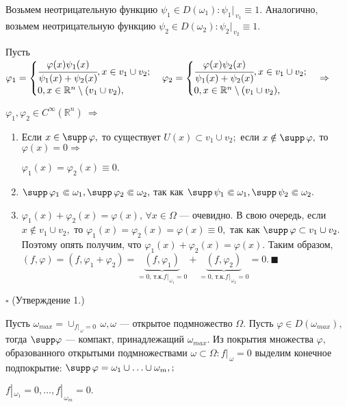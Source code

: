 \documentclass[12pt,a4paper,draft]{article}
\DeclareRobustCommand*{\т}{~--- }
\DeclareRobustCommand*{\ч}{~-- }
\begin{document}
Возьмем неотрицательную функцию $\psi_1\in D(\omega_1)\colon
\psi_1|_{\,v_1}\equiv1.$ Аналогично, возьмем неотрицательную
функцию $\psi_2\in D(\omega_2)\colon \psi_2|_{\,v_2}\equiv1.$

Пусть $\varphi_1=\begin{cases} \cfrac{\varphi(x)\psi_1(x)}{\psi_1(x)+\psi_2(x)}, x\in v_1\cup v_2;\\
0, x\in \mathbb R^n\setminus(v_1\cup v_2),\end{cases} \varphi_2=\begin{cases} \cfrac{\varphi(x)\psi_2(x)}{\psi_1(x)+\psi_2(x)}, x\in v_1\cup v_2;\\
0, x\in \mathbb R^n\setminus(v_1\cup v_2),\end{cases} \Rightarrow$

$\varphi_1, \varphi_2 \in C^{\infty}(\mathbb R^n)\ \Rightarrow$
\begin{enumerate}
\item Если $x\in \supp \,\varphi,$ то существует $U(x)\subset v_1\cup
v_2;$ если $x\notin \supp \,\varphi,$ то $\varphi(x)=0
\Rightarrow$

$\varphi_1(x)=\varphi_2(x)\equiv0.$
\item $\supp \,\varphi_1\Subset \omega_1, \supp \,\varphi_2\Subset
\omega_2,$ так как $\supp \,\psi_1\Subset \omega_1, \supp
\,\psi_2\Subset \omega_2.$
\item $\varphi_1(x)+\varphi_2(x)=\varphi(x),\,\forall x\in \Omega$
--- очевидно.
В свою очередь, если $x\notin v_1\cup v_2,$ то
$\varphi_1(x)=\varphi_2(x)=\varphi(x)\equiv0,$ так как $\supp
\,\varphi \subset v_1\cup v_2.$ Поэтому опять получим, что
$\varphi_1(x)+\varphi_2(x)=\varphi(x).$ Таким
образом,$(f,\varphi)=(f,\varphi_1+\varphi_2)=\underbrace{(f,\varphi_1)}_{=0,\,\mbox{т.к.}
 f|_{\,\omega_1}=0}+\underbrace{(f,\varphi_2)}_{=0,\,\mbox{т.к.}
 f|_{\,\omega_2}=0}=0. \,\blacksquare$
\end{enumerate}

$\square$ (Утверждение 1.)

Пусть $\omega_{max}=\cup%
_{f|_{\,\omega}=0}\,\omega, \omega$ --- открытое подмножество
$\Omega.$ Пусть $\varphi\in D(\omega_{max}),$ тогда $\supp
\varphi$
--- компакт, принадлежащий $\omega_{max}.$ Из покрытия множества
$\varphi,$ образованного открытыми подмножествами $\omega \subset
\Omega\colon f|_{\,\omega}=0$ выделим конечное подпокрытие: $\supp
\,\varphi=\omega_1\cup\ldots\cup\omega_m,;$

$f|_{\,\omega_1}=0, \ldots, f|_{\,\omega_m}=0.$
\end{document}
